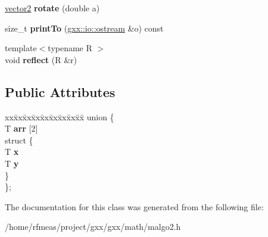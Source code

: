 \begin{DoxyCompactItemize}
\item 
\hyperlink{classmalgo_1_1vector2}{vector2} {\bfseries rotate} (double a)\hypertarget{classmalgo_1_1vector2_a2cca586c391fe96f06a87ad7eeeb05d4}{}\label{classmalgo_1_1vector2_a2cca586c391fe96f06a87ad7eeeb05d4}

\item 
size\+\_\+t {\bfseries print\+To} (\hyperlink{classgxx_1_1io_1_1ostream}{gxx\+::io\+::ostream} \&o) const \hypertarget{classmalgo_1_1vector2_aedf12dcfe044426c8d661ced8ef9660c}{}\label{classmalgo_1_1vector2_aedf12dcfe044426c8d661ced8ef9660c}

\item 
{\footnotesize template$<$typename R $>$ }\\void {\bfseries reflect} (R \&r)\hypertarget{classmalgo_1_1vector2_a9450dc31ff95f8c0c378da534db3f71f}{}\label{classmalgo_1_1vector2_a9450dc31ff95f8c0c378da534db3f71f}

\end{DoxyCompactItemize}
\subsection*{Public Attributes}
\begin{DoxyCompactItemize}
\item 
\begin{tabbing}
xx\=xx\=xx\=xx\=xx\=xx\=xx\=xx\=xx\=\kill
union \{\\
\>T {\bfseries arr} \mbox{[}2\mbox{]}\\
\>struct \{\\
\>\>T {\bfseries x}\\
\>\>T {\bfseries y}\\
\>\} \hypertarget{unionmalgo_1_1vector2_1_1_0D9_a10b2c933c7177147c0823b4ea0dfb44d}{}\label{unionmalgo_1_1vector2_1_1_0D9_a10b2c933c7177147c0823b4ea0dfb44d}
\\
\}; \hypertarget{classmalgo_1_1vector2_a3b6dbff2d4a89b71908e38d22165fd22}{}\label{classmalgo_1_1vector2_a3b6dbff2d4a89b71908e38d22165fd22}
\\

\end{tabbing}\end{DoxyCompactItemize}


The documentation for this class was generated from the following file\+:\begin{DoxyCompactItemize}
\item 
/home/rfmeas/project/gxx/gxx/math/malgo2.\+h\end{DoxyCompactItemize}
